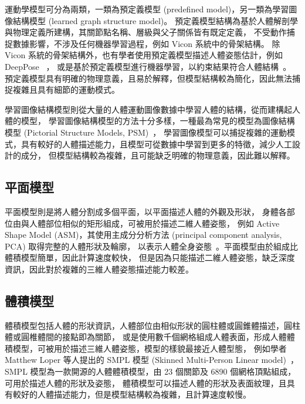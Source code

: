 運動學模型可分為兩類，一類為預定義模型 (predefined model)，另一類為學習圖像結構模型 (learned graph structure model)。
預定義模型結構為基於人體解剖學與物理定義所建構，其關節點名稱、層級與父子關係皆有既定定義，
不受動作捕捉數據影響，不涉及任何機器學習過程，例如 Vicon 系統中的骨架結構。
除 Vicon 系統的骨架結構外，也有學者使用預定義模型描述人體姿態估計，例如 DeepPose ~\cite{Toshev_2014_CVPR}，
或是基於預定義模型進行機器學習，以約束結果符合人體結構~\cite{wei2016convolutional}。
預定義模型具有明確的物理意義，且易於解釋，但模型結構較為簡化，因此無法捕捉複雜且具有細節的運動模式。

學習圖像結構模型則從大量的人體運動圖像數據中學習人體的結構，從而建構起人體的模型，
學習圖像結構模型的方法十分多樣，一種最為常見的模型為圖像結構模型 (Pictorial Structure Models, PSM)~\cite{johnson2010clustered}，
學習圖像模型可以捕捉複雜的運動模式，具有較好的人體描述能力，且模型可從數據中學習到更多的特徵，減少人工設計的成分，
但模型結構較為複雜，且可能缺乏明確的物理意義，因此難以解釋。

\subsection*{平面模型}
平面模型則是將人體分割成多個平面，以平面描述人體的外觀及形狀，
身體各部位由與人體部位相似的矩形組成，可被用於描述二維人體姿態，
例如 Active Shape Model (ASM)，其使用主成分分析方法 (principal component analysis, PCA) 取得完整的人體形狀及輪廓，
以表示人體全身姿態~\cite{freifeld2010contour}。平面模型由於組成比體積模型簡單，因此計算速度較快，
但是因為只能描述二維人體姿態，缺乏深度資訊，因此對於複雜的三維人體姿態描述能力較差。

\subsection*{體積模型}
體積模型包括人體的形狀資訊，人體部位由相似形狀的圓柱體或圓錐體描述，圓柱體或圓椎體間的接點即為關節，
或是使用數千個網格組成人體表面，形成人體體積模型，可被用於描述三維人體姿態，模型的樣貌最接近人體型態，
例如學者 Matthew Loper 等人提出的 SMPL 模型 (Skinned Multi-Person Linear model)~\cite{SMPL:2015}，
SMPL 模型為一款開源的人體體積模型，由 23 個關節及 6890 個網格頂點組成，可用於描述人體的形狀及姿態，
體積模型可以描述人體的形狀及表面紋理，且具有較好的人體描述能力，但是模型結構較為複雜，且計算速度較慢。

\clearpage

